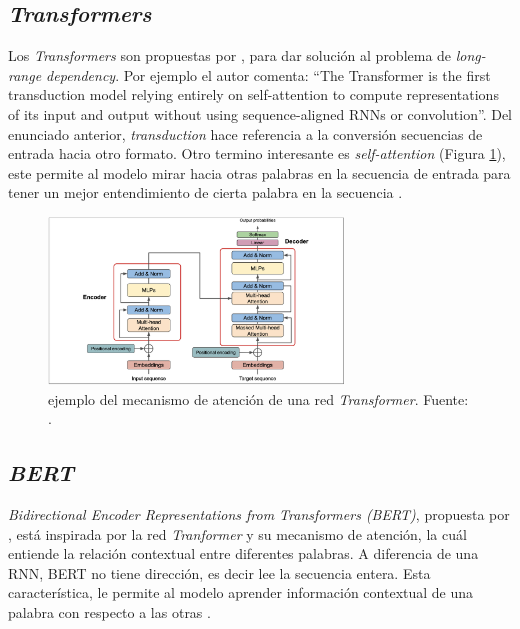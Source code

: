 \subsection{\textit{Transformers}}

Los \textit{Transformers} son propuestas por \cite{vaswani2017attention}, para dar solución al problema de \textit{long-range dependency}. Por ejemplo el autor comenta: ``The Transformer is the first transduction model relying entirely on self-attention to compute representations of its input and output without using sequence-aligned RNNs or convolution''. Del enunciado anterior, \textit{transduction} hace referencia a la conversión secuencias de entrada hacia otro formato. Otro termino interesante es \textit{self-attention} (Figura \ref{fig:transformer}), este permite al modelo mirar hacia otras palabras en la secuencia de entrada para tener un mejor entendimiento de cierta palabra en la secuencia  \citep{Kelvin_transformer2022}.  

\begin{figure}[H]
	\centering
	\includegraphics[width=0.7\textwidth]{img/neoantigen/transformer}
	\caption{ejemplo del mecanismo de atención de una red \textit{Transformer}. Fuente: \cite{zhang2021dive}.}
	\label{fig:transformer}
\end{figure}


\subsection{\textit{BERT}}

\textit{Bidirectional Encoder Representations from Transformers (BERT)}, propuesta por \cite{devlin2018bert}, está inspirada por la red \textit{Tranformer} y su mecanismo de atención, la cuál entiende la relación contextual entre diferentes palabras. A diferencia de una RNN, BERT no tiene dirección, es decir lee la secuencia entera. Esta característica, le permite al modelo aprender información contextual de una palabra con respecto a las otras \citep{Kelvin_transformer2022}.








